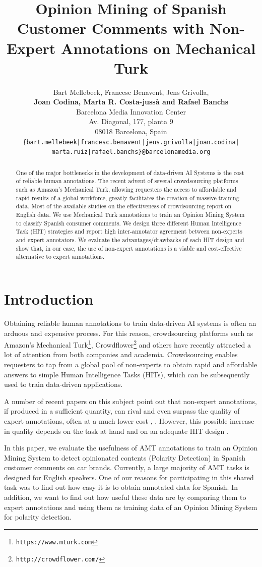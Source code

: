 \documentclass[11pt,letterpaper]{article}
\title{Opinion Mining of Spanish Customer Comments with Non-Expert Annotations on Mechanical Turk}
\author{Bart Mellebeek, Francesc Benavent, Jens Grivolla,\\
  \textbf{Joan Codina, Marta R. Costa-juss\`{a} and Rafael Banchs}\\
  Barcelona Media Innovation Center\\
  Av. Diagonal, 177, planta 9 \\
  08018 Barcelona, Spain\\
  {\tt \small \{bart.mellebeek|francesc.benavent|jens.grivolla|joan.codina|}\\
  {\tt \small marta.ruiz|rafael.banchs\}@barcelonamedia.org}}
\date{}
\begin{document}
\maketitle
\begin{abstract}
  One of the major bottlenecks in the development of data-driven AI Systems is the cost of reliable human annotations. The recent advent of several crowdsourcing platforms such as Amazon's Mechanical Turk, allowing requesters the access to affordable and rapid results of a global workforce, greatly facilitates the creation of massive training data. Most of the available studies on the effectiveness of crowdsourcing report on English data. We use Mechanical Turk annotations to train an Opinion Mining System to classify Spanish consumer comments. We design three different Human Intelligence Task (HIT) strategies and report high inter-annotator agreement between non-experts and expert annotators. We evaluate the advantages/drawbacks of each HIT design and show that, in our case, the use of non-expert annotations is a viable and cost-effective alternative to expert annotations.
\end{abstract}

\section{Introduction}
\label{sect:intro}

Obtaining reliable human annotations to train data-driven AI systems is often an arduous and expensive process. For this reason, crowdsourcing platforms such as Amazon's Mechanical Turk\footnote{\texttt{https://www.mturk.com}}, Crowdflower\footnote{\texttt{http://crowdflower.com/}} and others have recently attracted a lot of attention from both companies and academia. Crowdsourcing enables requesters to tap from a global pool of non-experts to obtain rapid and affordable answers to simple Human Intelligence Tasks (HITs), which can be subsequently used to train data-driven applications.

A number of recent papers on this subject point out that non-expert annotations, if produced in a sufficient quantity, can rival and even surpass the quality of expert annotations, often at a much lower cost \cite{snow_cheap_2008}, \cite{su_internet-scale_2007}. However, this possible increase in quality depends on the task at hand and on an adequate HIT design \cite{kittur_crowdsourcing_2008}. 

In this paper, we evaluate the usefulness of AMT annotations to train an Opinion Mining System to detect opinionated contents (Polarity Detection) in Spanish customer comments on car brands. Currently, a large majority of AMT tasks is designed for English speakers. One of our reasons for participating in this shared task was to find out how easy it is to obtain annotated data for Spanish. In addition, we want to find out how useful these data are by comparing them to expert annotations and using them as training data of an Opinion Mining System for polarity detection.
\end{document}
